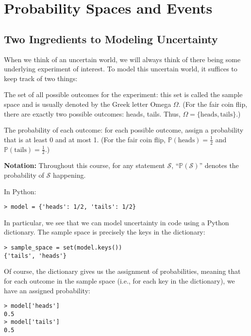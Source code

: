 \documentclass[6008notes.tex]{subfiles}
\begin{document}
\graphicspath{ {images/probspace/} }

\section{Probability Spaces and Events}

\subsection{Two Ingredients to Modeling Uncertainty}

When we think of an uncertain world, we will always think of there being some underlying experiment of interest. To model this uncertain world, it suffices to keep track of two things:

The set of all possible outcomes for the experiment: this set is called the sample space and is usually denoted by the Greek letter Omega $\Omega$.
(For the fair coin flip, there are exactly two possible outcomes: heads, tails. Thus, $\Omega =\{ \text {heads},\text {tails}\}$.)

The probability of each outcome: for each possible outcome, assign a probability that is at least 0 and at most 1.
(For the fair coin flip, $\mathbb {P}(\text {heads})=\frac{1}{2}$ and $\mathbb {P}(\text {tails})=\frac{1}{2}$.)

\textbf{Notation:} Throughout this course, for any statement $\mathcal{S}$, ``$\mathbb {P}(\mathcal{S})$'' denotes the probability of $\mathcal{S}$ happening.

In Python:

\begin{lstlisting}
> model = {'heads': 1/2, 'tails': 1/2}
\end{lstlisting}
In particular, we see that we can model uncertainty in code using a Python dictionary. The sample space is precisely the keys in the dictionary:

\begin{lstlisting}
> sample_space = set(model.keys())
{'tails', 'heads'}
\end{lstlisting}
Of course, the dictionary gives us the assignment of probabilities, meaning that for each outcome in the sample space (i.e., for each key in the dictionary), we have an assigned probability:

\begin{lstlisting}
> model['heads']
0.5
> model['tails']
0.5
\end{lstlisting}
\end{document}
